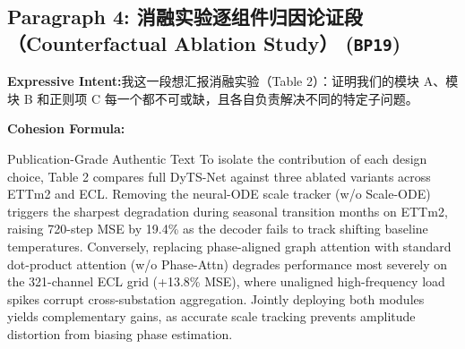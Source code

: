 \subsection*{Paragraph 4: 消融实验逐组件归因论证段（Counterfactual Ablation Study） (\texttt{BP19})}
\noindent\textbf{Expressive Intent:}\enspace 我这一段想汇报消融实验（Table 2）：证明我们的模块 A、模块 B 和正则项 C 每一个都不可或缺，且各自负责解决不同的特定子问题。\par
\noindent\textbf{Cohesion Formula:}\par\vspace{4pt}
\begin{ExampleBox}{Publication-Grade Authentic Text}
To isolate the contribution of each design choice, Table 2 compares full DyTS-Net against three ablated variants across ETTm2 and ECL. Removing the neural-ODE scale tracker (w/o Scale-ODE) triggers the sharpest degradation during seasonal transition months on ETTm2, raising 720-step MSE by 19.4\% as the decoder fails to track shifting baseline temperatures. Conversely, replacing phase-aligned graph attention with standard dot-product attention (w/o Phase-Attn) degrades performance most severely on the 321-channel ECL grid (+13.8\% MSE), where unaligned high-frequency load spikes corrupt cross-substation aggregation. Jointly deploying both modules yields complementary gains, as accurate scale tracking prevents amplitude distortion from biasing phase estimation.
\end{ExampleBox}
